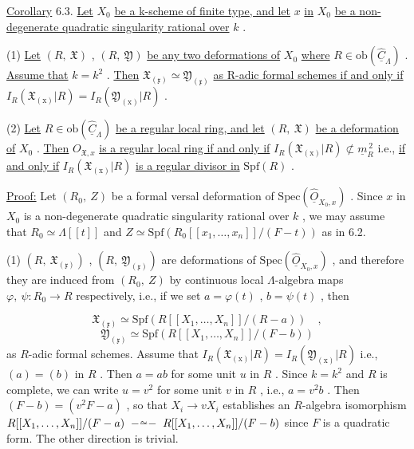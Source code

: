 \underline{Corollary} 6.3.  \underline{Let}  $X_0$  \underline{be a k-scheme of finite type, and let}  $x$  \underline{in}  $X_0$  \underline{be a non-degenerate quadratic singularity rational over}  $k$  .

(1)  \underline{Let}  $(R,\ \mathfrak{X})$ ,  $(R,\ \mathfrak{Y})$  \underline{be any two deformations of}  $X_0$  \underline{where} $R \in \mathrm{ob}(\hat{\underline{C}}_{\Lambda})$  . \underline{Assume that}  $k = k^2$  . \underline{Then}  $\mathfrak{X}_{(\mathfrak{x})} \simeq \mathfrak{Y}_{(\mathfrak{x})}$  \underline{as R-adic formal schemes if and only if}  $I_R(\mathfrak{X}_{(\mathrm{x})}|R) = I_R(\mathfrak{Y}_{(\mathrm{x})}|R)$  .

(2)  \underline{Let}  $R \in \mathrm{ob}(\hat{\underline{C}}_{\Lambda})$  \underline{be a regular local ring, and let}  $(R,\ \mathfrak{X})$  \underline{be a deformation of}  $X_0$  . \underline{Then}  $O_{\mathfrak{X},x}$  \underline{is a regular local ring if and only if} $I_R(\mathfrak{X}_{(\mathrm{x})}|R) \not\subset \underline{m}_R^{\,2}$  i.e., \underline{if and only if}  $I_R(\mathfrak{X}_{(\mathrm{x})}|R)$  \underline{is a regular divisor in} $\mathrm{Spf}(R)$  .

\underline{Proof:}  Let  $(R_0,\ Z)$  be a formal versal deformation of  $\mathrm{Spec}(\hat{\underline{O}}_{X_0,x})$  . Since  $x$ in  $X_0$  is a non-degenerate quadratic singularity rational over  $k$  , we may assume that  $R_0 \simeq \Lambda[[t]]$  and  $Z \simeq \mathrm{Spf}(R_0[[x_1,\dots,x_n]]/(F - t))$  as in 6.2.

(1)  $(R,\ \mathfrak{X}_{(\mathfrak{x})})$ ,  $(R,\ \mathfrak{Y}_{(\mathfrak{x})})$  are deformations of  $\mathrm{Spec}(\hat{\underline{O}}_{X_0,x})$  , and therefore they are induced from  $(R_0,\ Z)$  by continuous local $\Lambda$-algebra maps $\varphi,\ \psi : R_0 \rightarrow R$  respectively, i.e., if we set  $a = \varphi(t)$  ,  $b = \psi(t)$  , then

\begin{equation*}
\mathfrak{X}_{(\mathfrak{x})} \simeq \mathrm{Spf}(R[[X_1,\dots,X_n]]/(R - a)) \quad ,
\end{equation*}
\begin{equation*}
\mathfrak{Y}_{(\mathfrak{x})} \simeq \mathrm{Spf}(R[[X_1,\dots,X_n]]/(F - b))
\end{equation*}
as $R$-adic formal schemes. Assume that  $I_R(\mathfrak{X}_{(\mathrm{x})}|R) = I_R(\mathfrak{Y}_{(\mathrm{x})}|R)$  i.e.,
$(a) = (b)$ in $R$ . Then $a = ab$ for some unit $u$ in $R$ . Since $k = k^2$ and $R$ is complete, we can write $u = v^2$ for some unit $v$ in $R$ , i.e., $a = v^2b$ . Then $(F - b) = (v^2F - a)$ , so that $X_i \to vX_i$ establishes an $R$-algebra isomorphism $R[[X_1,\ldots,X_n]]/(F - a) \;\overset{\sim}{\relbar\relbar\relbar}\; R[[X_1,\ldots,X_n]]/(F - b)$ since $F$ is a quadratic form. The other direction is trivial.

